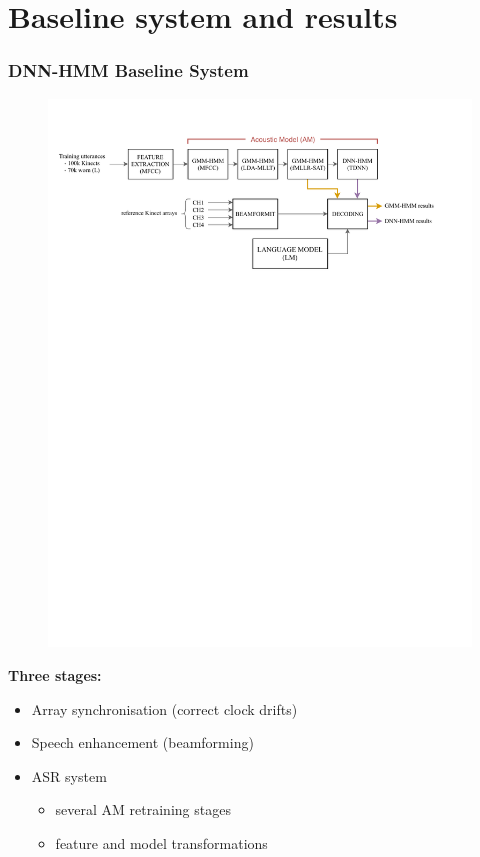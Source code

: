 \documentclass{beamer}
\begin{document}
\section{Baseline system and results}
\begin{frame}
  \frametitle{DNN-HMM Baseline System}
  
  \begin{figure}
  \centering
  \includegraphics[width=\textwidth]{img/conv_baseline_sketch}
  \end{figure}  

  \vspace{-.5em}  
  \begin{minipage}[bt]{.7\textwidth}
    \textbf{Three stages: }  

    \begin{itemize}
    \item Array synchronisation (correct clock drifts)
    \item Speech enhancement (beamforming)
    \item ASR system 
      \begin{itemize}
      \item several AM retraining stages
      \item feature and model transformations
      \end{itemize}
    \end{itemize}
    

\end{minipage}
\end{frame}
\end{document}
